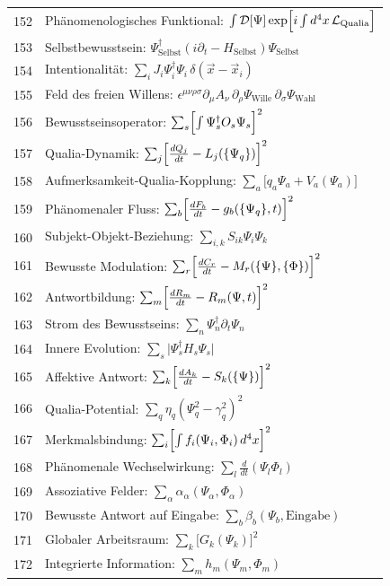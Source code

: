 \documentclass[11pt,a4paper]{article}
\begin{document}
\begin{longtable}{r l}
		152 & Phänomenologisches Funktional: $\int\mathcal{D}[\Psi]\exp\Bigl[i\int d^4x\,\mathcal{L}_{\text{Qualia}}\Bigr]$ \\
		153 & Selbstbewusstsein: $\Psi^\dagger_{\text{Selbst}}(i\partial_t - H_{\text{Selbst}})\Psi_{\text{Selbst}}$ \\
		154 & Intentionalität: $\sum_i J_i\Psi^\dagger_i\Psi_i\,\delta(\vec x - \vec x_i)$ \\
		155 & Feld des freien Willens: $\epsilon^{\mu\nu\rho\sigma}\partial_\mu A_\nu\,\partial_\rho\Psi_{\text{Wille}}\,\partial_\sigma\Psi_{\text{Wahl}}$ \\
		156 & Bewusstseinsoperator: $\sum_s\Bigl[\int\Psi^\dagger_s O_s\Psi_s\Bigr]^2$ \\
		157 & Qualia-Dynamik: $\sum_j\Bigl[\frac{dQ_j}{dt} - L_j(\{\Psi_q\})\Bigr]^2$ \\
		158 & Aufmerksamkeit-Qualia-Kopplung: $\sum_a\bigl[q_a\Psi_a + V_a(\Psi_a)\bigr]$ \\
		159 & Phänomenaler Fluss: $\sum_b\Bigl[\frac{dF_b}{dt} - g_b(\{\Psi_q\},t)\Bigr]^2$ \\
		160 & Subjekt-Objekt-Beziehung: $\sum_{i,k}S_{ik}\Psi_i\Psi_k$ \\
		161 & Bewusste Modulation: $\sum_r\Bigl[\frac{dC_r}{dt} - M_r(\{\Psi\},\{\Phi\})\Bigr]^2$ \\
		162 & Antwortbildung: $\sum_m\Bigl[\frac{dR_m}{dt} - R_m(\Psi,t)\Bigr]^2$ \\
		163 & Strom des Bewusstseins: $\sum_n\Psi^\dagger_n\partial_t\Psi_n$ \\
		164 & Innere Evolution: $\sum_s\bigl|\Psi^\dagger_s H_s\Psi_s\bigr|$ \\
		165 & Affektive Antwort: $\sum_k\Bigl[\frac{dA_k}{dt} - S_k(\{\Psi\})\Bigr]^2$ \\
		166 & Qualia-Potential: $\sum_q\eta_q(\Psi_q^2 - \gamma_q^2)^2$ \\
		167 & Merkmalsbindung: $\sum_i\Bigl[\int f_i(\Psi_i,\Phi_i)\,d^4x\Bigr]^2$ \\
		168 & Phänomenale Wechselwirkung: $\sum_l\frac{d}{dt}(\Psi_l\Phi_l)$ \\
		169 & Assoziative Felder: $\sum_\alpha\alpha_\alpha(\Psi_\alpha,\Phi_\alpha)$ \\
		170 & Bewusste Antwort auf Eingabe: $\sum_b\beta_b(\Psi_b,\text{Eingabe})$ \\
		171 & Globaler Arbeitsraum: $\sum_k\bigl[G_k(\Psi_k)\bigr]^2$ \\
		172 & Integrierte Information: $\sum_m h_m(\Psi_m,\Phi_m)$ \\

\end{longtable}
\end{document}
